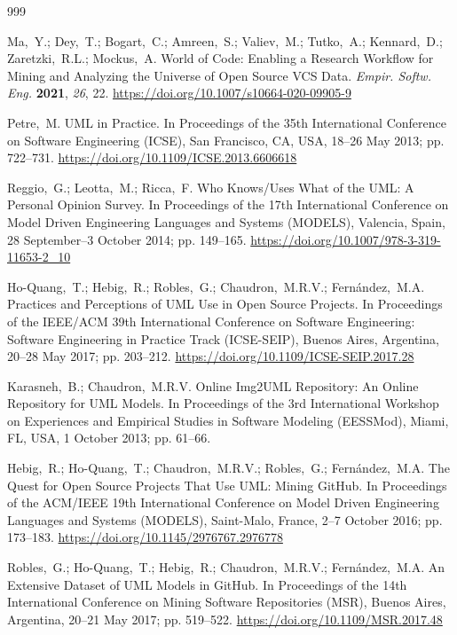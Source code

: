 \documentclass[11pt]{article}
\begin{document}
\begin{thebibliography}{999}

Ma,~Y.; Dey,~T.; Bogart,~C.; Amreen,~S.; Valiev,~M.; Tutko,~A.; Kennard,~D.; Zaretzki,~R.L.; Mockus,~A. World of Code: Enabling a Research Workflow for Mining and Analyzing the Universe of Open Source VCS Data. {\em Empir. Softw. Eng.} {\bf 2021}, {\em 26}, 22. \url{https://doi.org/10.1007/s10664-020-09905-9}

Petre,~M. UML in Practice. In Proceedings of the 35th International Conference on Software Engineering (ICSE), San Francisco, CA, USA, 18--26 May 2013; pp. 722--731. \url{https://doi.org/10.1109/ICSE.2013.6606618}

Reggio,~G.; Leotta,~M.; Ricca,~F. Who Knows/Uses What of the UML: A Personal Opinion Survey. In Proceedings of the 17th International Conference on Model Driven Engineering Languages and Systems (MODELS), Valencia, Spain, 28 September--3 October 2014; pp. 149--165. \url{https://doi.org/10.1007/978-3-319-11653-2_10}

Ho-Quang,~T.; Hebig,~R.; Robles,~G.; Chaudron,~M.R.V.; Fern\'{a}ndez,~M.A. Practices and Perceptions of UML Use in Open Source Projects. In Proceedings of the IEEE/ACM 39th International Conference on Software Engineering: Software Engineering in Practice Track (ICSE-SEIP), Buenos Aires, Argentina, 20--28 May 2017; pp. 203--212. \url{https://doi.org/10.1109/ICSE-SEIP.2017.28}

Karasneh,~B.; Chaudron,~M.R.V. Online Img2UML Repository: An Online Repository for UML Models. In Proceedings of the 3rd International Workshop on Experiences and Empirical Studies in Software Modeling (EESSMod), Miami, FL, USA, 1 October 2013; pp. 61--66.

Hebig,~R.; Ho-Quang,~T.; Chaudron,~M.R.V.; Robles,~G.; Fern\'{a}ndez,~M.A. The Quest for Open Source Projects That Use UML: Mining GitHub. In Proceedings of the ACM/IEEE 19th International Conference on Model Driven Engineering Languages and Systems (MODELS), Saint-Malo, France, 2--7 October 2016; pp. 173--183. \url{https://doi.org/10.1145/2976767.2976778}

Robles,~G.; Ho-Quang,~T.; Hebig,~R.; Chaudron,~M.R.V.; Fern\'{a}ndez,~M.A. An Extensive Dataset of UML Models in GitHub. In Proceedings of the 14th International Conference on Mining Software Repositories (MSR), Buenos Aires, Argentina, 20--21 May 2017; pp. 519--522. \url{https://doi.org/10.1109/MSR.2017.48}


\end{thebibliography}
\end{document}

